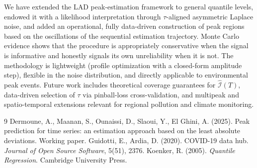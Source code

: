 \documentclass[11pt,a4paper]{article}
\begin{document}
We have extended the LAD peak-estimation framework to general quantile
levels, endowed it with a likelihood interpretation through $\tau$-aligned
asymmetric Laplace noise, and added an operational, fully data-driven
construction of peak regions based on the oscillations of the sequential
estimation trajectory. Monte Carlo evidence shows that the procedure is
appropriately conservative when the signal is informative and honestly
signals its own unreliability when it is not. The methodology is lightweight
(profile optimization with a closed-form amplitude step), flexible in the
noise distribution, and directly applicable to environmental peak events.
Future work includes theoretical coverage guarantees for
$\widehat{\mathcal I}(T)$, data-driven selection of $\tau$ via pinball-loss
cross-validation, and multipeak and spatio-temporal extensions relevant for
regional pollution and climate monitoring.

{\small
\begin{thebibliography}{9}
\setlength{\itemsep}{2pt}
Dermoune, A., Maanan, S., Ounaissi, D., Slaoui, Y., El Ghini, A. (2025).
Peak prediction for time series: an estimation approach based on the
least absolute deviations. Working paper.
Guidotti, E., Ardia, D. (2020). COVID-19 data hub. \emph{Journal of Open
Source Software}, 5(51), 2376.
Koenker, R. (2005). \emph{Quantile Regression}. Cambridge University Press.
\end{thebibliography}
}
\end{document}
